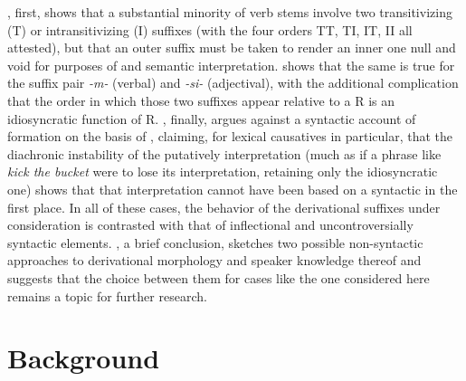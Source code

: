 \documentclass[output=paper,
modfonts
]{LSP/langsci}
\begin{document}
, first, shows that a substantial minority of verb stems
involve two transitivizing (T) or intransitivizing (I) suffixes (with
the four orders TT, TI, IT, II all attested), but that an outer suffix
must be taken to render an inner one null and void for purposes of
 and semantic interpretation.  shows that the
same is true for the suffix pair \textit{-m-} (verbal) and \textit{-si-}
(adjectival), with the additional complication that the order in which
those two suffixes appear relative to a  R is an idiosyncratic
function of R. , finally, argues against a syntactic account of
 formation on the basis of , claiming, for lexical
causatives in particular, that the diachronic instability of the
putatively   interpretation (much as if a phrase
like \textit{kick the bucket} were to lose its 
interpretation, retaining only the idiosyncratic one) shows that that
interpretation cannot have been based on a syntactic  in the
first place. In all of these cases, the behavior of the derivational
suffixes under consideration is contrasted with that of inflectional and
uncontroversially syntactic elements. , a brief conclusion,
sketches two possible non-syntactic approaches to derivational
morphology and speaker knowledge thereof and suggests that the choice
between them for cases like the one considered here remains a topic for
further research.

\section{Background}\label{background}
\end{document}
